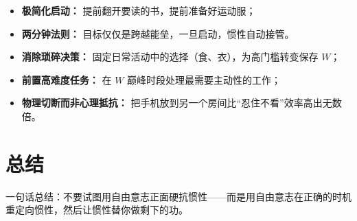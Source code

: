 \begin{methodbox}[title={方法 2：降低激活能垒}]
\begin{itemize}[nosep]
  \item \textbf{极简化启动：} 提前翻开要读的书，提前准备好运动服；
  \item \textbf{两分钟法则：} 目标仅仅是跨越能垒，一旦启动，惯性自动接管。
\end{itemize}
\end{methodbox}

\begin{methodbox}[title={方法 3：保护意志电池}]
\begin{itemize}[nosep]
  \item \textbf{消除琐碎决策：} 固定日常活动中的选择（食、衣），为高门槛转变保存 $W$；
  \item \textbf{前置高难度任务：} 在 $W$ 巅峰时段处理最需要主动性的工作；
  \item \textbf{物理切断而非心理抵抗：} 把手机放到另一个房间比“忍住不看”效率高出无数倍。
\end{itemize}
\end{methodbox}

\section{总结}\label{sec:summary}

\begin{insightbox}
一句话总结：不要试图用自由意志正面硬抗惯性——而是用自由意志在正确的时机重定向惯性，然后让惯性替你做剩下的功。
\end{insightbox}
